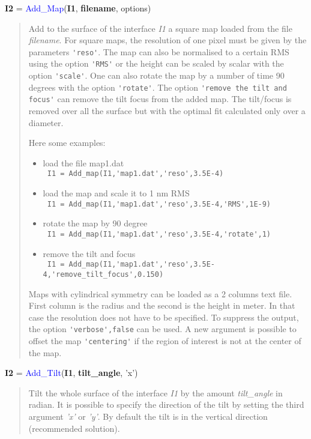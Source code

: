 \noindent \textbf{I2} = \textcolor{blue}{Add\_Map}(\textbf{I1}, \textbf{filename}, options)
\vspace*{-0.2cm}
\begin{quote}
Add to the surface of the interface \textsl{I1} a square map loaded from the file \textsl{filename}. For square maps, the resolution of one pixel must be given by the parameters \verb?'reso'?. The map can also be normalised to a certain RMS using the option \verb?'RMS'? or the height can be scaled by scalar with the option \verb?'scale'?. One can also rotate the map by a number of time 90 degrees with the option \verb?'rotate'?. The option \verb?'remove the tilt and focus'? can remove the tilt focus from the added map. The tilt/focus is removed over all the surface but with the optimal fit calculated only over a diameter.

Here some examples:
\begin{itemize}
  \item load the file map1.dat \\
        \verb? I1 = Add_map(I1,'map1.dat','reso',3.5E-4) ?
  \item load the map and scale it to 1 nm RMS \\
        \verb? I1 = Add_map(I1,'map1.dat','reso',3.5E-4,'RMS',1E-9) ?
  \item rotate the map by 90 degree \\
        \verb? I1 = Add_map(I1,'map1.dat','reso',3.5E-4,'rotate',1) ?
  \item remove the tilt and focus \\
         \verb? I1 = Add_map(I1,'map1.dat','reso',3.5E-4,'remove_tilt_focus',0.150) ?
\end{itemize}

Maps with cylindrical symmetry can be loaded as a 2 columns text file. First column is the radius and the second is the height in meter. In that case the resolution does not have to be specified. To suppress the output, the option \verb?'verbose',false? can be used. A new argument is possible to offset the map \verb?'centering'? if the region of interest is not at the center of the map.
\end{quote}


\noindent \textbf{I2} = \textcolor{blue}{Add\_Tilt}(\textbf{I1}, \textbf{tilt\_angle}, 'x')
\vspace*{-0.2cm}
\begin{quote}
Tilt the whole surface of the interface \textsl{I1} by the amount \textsl{tilt\_angle} in radian. It is possible to specify the direction of the tilt by setting the third argument \textsl{'x'} or \textsl{'y'}. By default the tilt is in the vertical direction (recommended solution).
\end{quote}


